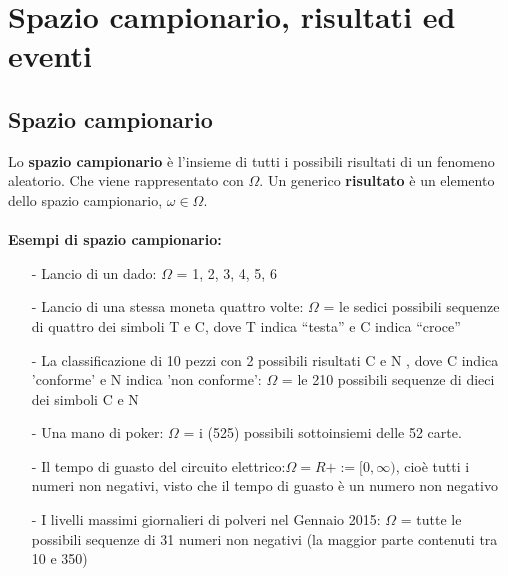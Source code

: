 \documentclass[12pt, letterpaper]{article}
\begin{document}
\section{Spazio campionario, risultati ed eventi}

\subsection{Spazio campionario}
Lo \textbf{spazio campionario} è l'insieme di tutti i possibili risultati di un fenomeno aleatorio. Che viene rappresentato con 
$\Omega$. Un generico \textbf{risultato} è un elemento dello spazio campionario, $\omega \in \Omega$.
\\
\\
\textbf{Esempi di spazio campionario:}
\\
\begin{itemize}
   \item[-] Lancio di un dado: $\Omega$ = {1, 2, 3, 4, 5, 6}
   \item[-] Lancio di una stessa moneta quattro volte: $\Omega$ = le sedici possibili sequenze di quattro dei simboli T e C, dove T indica “testa” e C indica “croce”
   \item[-] La classificazione di 10 pezzi con 2 possibili risultati C e N , dove C indica ’conforme’ e N indica ’non conforme’: $\Omega$ = le 210 possibili sequenze di dieci dei simboli C e N
   \item[-] Una mano di poker: $\Omega$ = i (525) possibili sottoinsiemi delle 52 carte.
   \item[-] Il tempo di guasto del circuito elettrico:\( \Omega = R+ := [0, \infty)\), cioè tutti i numeri non negativi, visto che il tempo di guasto è un numero non negativo
   \item[-] I livelli massimi giornalieri di polveri nel Gennaio 2015: $\Omega$ = tutte le
   possibili sequenze di 31 numeri non negativi (la maggior parte
   contenuti tra 10 e 350)
\end{itemize}
\end{document}
